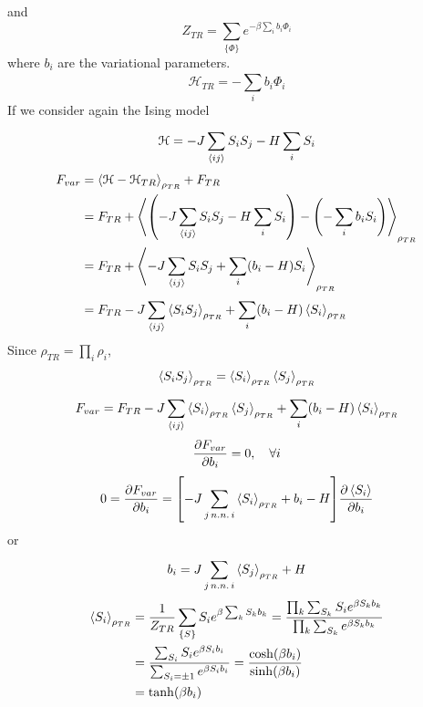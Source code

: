 \documentclass[../main/main.tex]{subfiles}
\begin{document}
and
\begin{equation}
  Z_{TR} = \sum_{\{ \Phi  \}  }^{}  e^{-\beta \sum_{i}^{} b_i \Phi _i  }
\end{equation}
where \( b_i \) are the variational parameters.
\begin{equation}
  \mathcal{H}_{TR} = - \sum_{i}^{} b_i \Phi _i
\end{equation}
If we consider again the Ising model
\begin{equation}
  \mathcal{H} = - J \sum_{\expval{ij} }^{} S_i S_j - H \sum_{i}^{} S_i
\end{equation}
\begin{equation}
\begin{split}
F_{var}  &= \expval{\mathcal{H} - \mathcal{H}_{TR}}_{\rho _{TR}} + F_{TR}   \\
& = F_{TR} + \expval{\qty(- J \sum_{\expval{ij} }^{} S_i S_j - H \sum_{i}^{} S_i    ) - \qty(- \sum_{i}^{} b_i S_i )  }_{\rho _{TR}} \\
& = F_{TR} + \expval{-J \sum_{\expval{ij} }^{} S_i S_j + \sum_{i}^{} (b_i-H) S_i   }_{\rho _{TR}} \\
& = F_{TR} - J \sum_{\expval{ij} }^{} \expval{S_i S_j}_{\rho _{TR}} + \sum_{i}^{} (b_i - H) \expval{S_i}_{\rho _{TR}}
\end{split}
\end{equation}
Since \( \rho _{TR} = \prod_{i}^{} \rho _i  \),
\begin{equation}
  \expval{S_i S_j}_{\rho _{TR}}  = \expval{S_i}_{\rho _{TR}}  \expval{S_j}_{\rho _{TR}}
\end{equation}
\begin{equation}
  F_{var} = F_{TR} - J \sum_{\expval{ij} }^{} \expval{S_i}_{\rho _{TR}}  \expval{S_j}_{\rho _{TR}}  + \sum_{i}^{} (b_i - H) \expval{S_i}_{\rho _{TR}}
\end{equation}
\begin{equation}
  \pdv{F_{var}}{b_i} = 0, \quad \forall i
\end{equation}
\begin{equation}
  0 = \pdv{F_{var}}{b_i} = \qty[-J \sum_{j \, n.n. \, i}^{} \expval{S_i}_{\rho _{TR}}  + b_i - H  ] \pdv{\expval{S_i} }{b_i}
\end{equation}
or
\begin{equation}
  b_i = J \sum_{j \, n.n. \, i}^{} \expval{S_j}_{\rho _{TR}} + H
\end{equation}
\begin{equation}
\begin{split}
\expval{S_i}_{\rho _{TR}}    &= \frac{1}{Z_{TR}} \sum_{\{ S \}  }^{} S_i e^{\beta \sum_{k}^{} S_k b_k } = \frac{\prod_{k}^{}  \sum_{S_k}^{} S_i e^{\beta S_k b_k}   }{\prod_{k}^{} \sum_{S_k}^{} e^{\beta S_k b_k}    }  \\
& = \frac{\sum_{S_i}^{} S_i e^{\beta S_i b_i}  }{\sum_{S_i = \pm 1}^{} e^{\beta S_i b_i}   } = \frac{\cosh (\beta b_i)}{\sinh (\beta b_i)} \\
&= \tanh (\beta b_i)
\end{split}
\end{equation}
\end{document}
